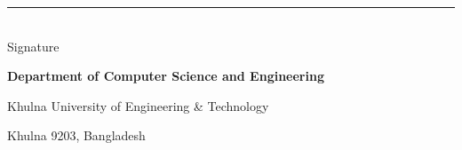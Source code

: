 {\begin{titlepage}
{    %
    \par\medskip
    \hspace*{0.6in}{\fontsize{12}{18}\selectfont \bfseries \@supervisor}\par
    \hspace*{0.6in}{\fontsize{12}{18}\selectfont \@supervisortitle}\par
    \hspace*{0.6in}{\fontsize{12}{18}\selectfont \@supervisordepartment}\par
    \hspace*{0.6in}{\fontsize{12}{18}\selectfont \@supervisoruniv}\par
    \vspace*{-72pt}%
    \hfill
    \begin{minipage}{1.6in}
      \centering
      \rule{1.6in}{0.4pt}\\[-0.3ex]
      {\fontsize{12}{18}\selectfont Signature}
    \end{minipage}
    \par
    \vspace*{72pt}

    \vfill
    \begin{center}
      {\fontsize{12}{18}\selectfont \bfseries
        Department of Computer Science and Engineering\par
        Khulna University of Engineering \& Technology\par
        Khulna 9203, Bangladesh\par
        \@date\par}
    \end{center}

    }%
  \end{titlepage}

}


%   

